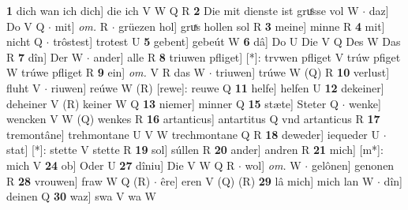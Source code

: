 \documentclass[8pt,a4paper,notitlepage]{article}
\begin{document}
\begin{table}[ht]
\begin{minipage}[t]{0.5\linewidth}
\textbf{1} dich wan ich dich] die ich V W Q R \textbf{2} Die mit dienste ist gruͤsse vol W  $\cdot$ daz] Do V Q  $\cdot$ mit] \textit{om.} R  $\cdot$ grüezen hol] gruͯs hollen sol R \textbf{3} meine] minne R \textbf{4} mit] nicht Q  $\cdot$ trôstest] trotest U \textbf{5} gebent] gebeút W \textbf{6} dâ] Do U Die V Q Des W Das R \textbf{7} dîn] Der W  $\cdot$ ander] alle R \textbf{8} triuwen pfliget] [*]: trvwen pfliget V trúw pfiget W trúwe pfliget R \textbf{9} ein] \textit{om.} V R das W  $\cdot$ triuwen] trúwe W (Q) R \textbf{10} verlust] fluht V  $\cdot$ riuwen] reúwe W (R) [rewe]: reuwe  Q \textbf{11} helfe] helfen U \textbf{12} dekeiner] deheiner V (R) keiner W Q \textbf{13} niemer] minner Q \textbf{15} stæte] Steter Q  $\cdot$ wenke] wencken V W (Q) wenkes R \textbf{16} artanticus] antartitus Q vnd artanticus R \textbf{17} tremontâne] trehmontane U V W trechmontane Q R \textbf{18} deweder] iequeder U  $\cdot$ stat] [*]: stette V stette R \textbf{19} sol] súllen R \textbf{20} ander] andren R \textbf{21} mich] [m*]: mich V \textbf{24} ob] Oder U \textbf{27} dîniu] Die V W Q R  $\cdot$ wol] \textit{om.} W  $\cdot$ gelônen] genonen R \textbf{28} vrouwen] fraw W Q (R)  $\cdot$ êre] eren V (Q) (R) \textbf{29} lâ mich] mich lan W  $\cdot$ dîn] deinen Q \textbf{30} waz] swa V wa W \newline
\end{minipage}
\end{table}
\end{document}

